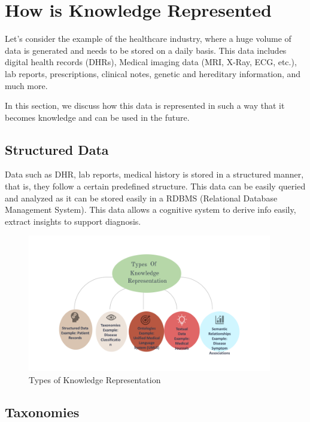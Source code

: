 \documentclass[12pt]{report}
\begin{document}
\section{How is Knowledge Represented}

Let's consider the example of the healthcare industry, where a huge volume of
data is generated and needs to be stored on a daily basis. This data includes
digital health records (DHRs), Medical imaging data (MRI, X-Ray, ECG, etc.),
lab reports, prescriptions, clinical notes, genetic and hereditary information,
and much more.

In this section, we discuss how this data is represented in such a way that it
becomes knowledge and can be used in the future.

\subsection{Structured Data}

Data such as DHR, lab reports, medical history is stored in a structured
manner, that is, they follow a certain predefined structure. This data can be
easily queried and analyzed as it can be stored easily in a RDBMS (Relational
Database Management System). This data allows a cognitive system to derive info
easily, extract insights to support diagnosis.

\begin{figure}[h!]
	\begin{center}
		\includegraphics[width=0.95\textwidth]{images/types.png}
	\end{center}
	\caption{Types of Knowledge Representation}\label{fig:types}
\end{figure}

\subsection{Taxonomies}
\end{document}
